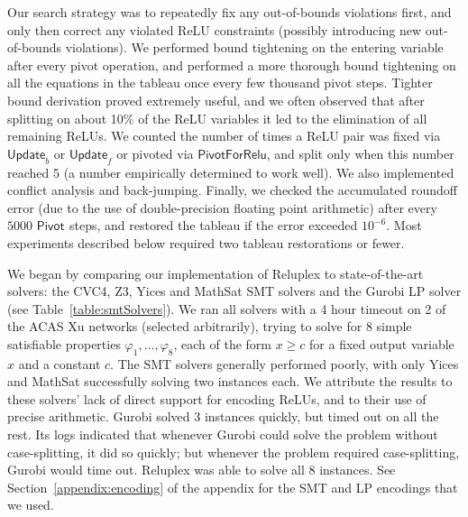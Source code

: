 \documentclass[a4paper]{llncs}
\newcommand{\rulename}[1]{\ensuremath{\mathsf{#1}}\xspace}
\newcommand{\irulename}[2]{\ensuremath{\mathsf{#1}_{#2}}\xspace}
\newcommand{\pivot}[1]{\irulename{Pivot}{#1}}
\newcommand{\updateb}{\irulename{Update}{b}}
\newcommand{\updatef}{\irulename{Update}{f}}
\newcommand{\pivotForRelu}{\rulename{PivotForRelu}}
\begin{document}
Our search strategy was to repeatedly fix any out-of-bounds violations first,
and only then correct any violated ReLU constraints (possibly introducing
new out-of-bounds violations). We performed bound
tightening on the entering variable after every pivot
operation,
and performed a more thorough bound tightening
on all the equations in the tableau
 once every
 few thousand pivot steps. 
 Tighter bound derivation proved extremely useful, and we often
observed that after splitting on about 10\% of the
ReLU variables it led to the elimination of all remaining ReLUs.
We counted the number of times a ReLU pair was
fixed via
\updateb{} or \updatef{} or pivoted via \pivotForRelu{}, and
split only when this number reached 5 (a number empirically determined to work
well).
We also implemented conflict analysis and back-jumping.
Finally, we checked the
 accumulated roundoff error
(due to the use of double-precision floating point arithmetic)
 after every $5000$ \pivot{} steps, and
 restored the tableau if the error exceeded $10^{-6}$. Most 
 experiments described below required two tableau restorations or fewer.

We began by comparing our implementation of Reluplex to state-of-the-art solvers: the CVC4,
Z3, Yices and MathSat SMT solvers and the Gurobi LP solver (see Table~\ref{table:smtSolvers}). 
We ran all solvers with a 4 hour timeout on 2 of the ACAS Xu networks
(selected arbitrarily),
trying to solve for 8 
simple satisfiable properties $\varphi_1,\ldots,\varphi_8$, each of
the form $x\geq c$ for a fixed output
variable $x$ and a constant $c$. 
The SMT solvers generally performed poorly, with only Yices and
MathSat successfully solving two instances each. 
We attribute the results to these solvers' lack of direct support for
encoding ReLUs, and to their use of precise arithmetic. Gurobi 
solved 3 instances quickly, but timed out on all the rest. 
Its logs indicated that whenever Gurobi could solve the problem
without case-splitting, it did so quickly; but whenever the problem required
case-splitting, Gurobi would time out. Reluplex was able to solve all
8 instances. 
See Section~\ref*{appendix:encoding} of the
appendix
for the SMT and LP encodings that we used.
\end{document}
